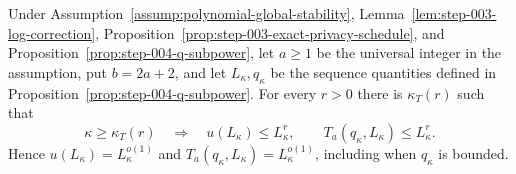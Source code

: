 \begin{lemma}
\label{lem:step-004-schedule-subpower}
Under Assumption~\ref{assump:polynomial-global-stability},
Lemma~\ref{lem:step-003-log-correction},
Proposition~\ref{prop:step-003-exact-privacy-schedule}, and
Proposition~\ref{prop:step-004-q-subpower}, let \(a\geq1\) be the
universal integer in the assumption, put \(b=2a+2\), and let
\(L_\kappa,q_\kappa\) be the sequence quantities defined in
Proposition~\ref{prop:step-004-q-subpower}.  For every \(r>0\) there is
\(\kappa_T(r)\) such that
\begin{equation}
\kappa\geq\kappa_T(r)
\quad\Longrightarrow\quad
u(L_\kappa)\leq L_\kappa^r,\qquad
T_a(q_\kappa,L_\kappa)\leq L_\kappa^r.
\label{eq:app-a72}
\end{equation}
Hence \(u(L_\kappa)=L_\kappa^{o(1)}\) and
\(T_a(q_\kappa,L_\kappa)=L_\kappa^{o(1)}\), including when
\(q_\kappa\) is bounded.
\end{lemma}

